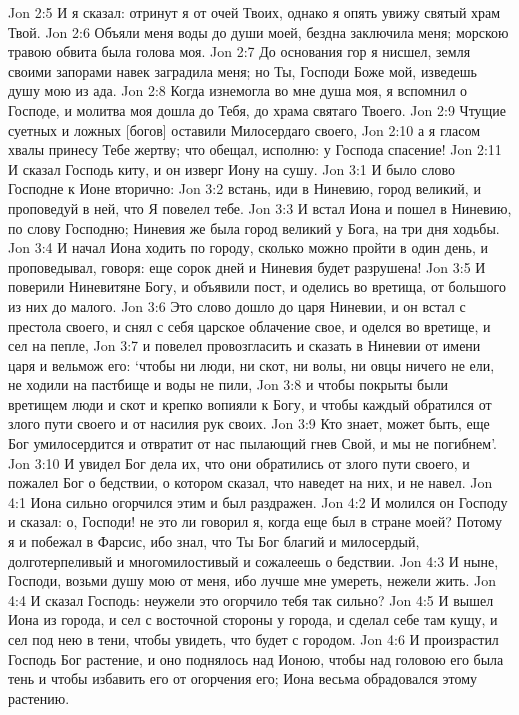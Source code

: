 Jon 2:5  И я сказал: отринут я от очей Твоих, однако я опять увижу святый храм Твой.
Jon 2:6  Объяли меня воды до души моей, бездна заключила меня; морскою травою обвита была голова моя.
Jon 2:7  До основания гор я нисшел, земля своими запорами навек заградила меня; но Ты, Господи Боже мой, изведешь душу мою из ада.
Jon 2:8  Когда изнемогла во мне душа моя, я вспомнил о Господе, и молитва моя дошла до Тебя, до храма святаго Твоего.
Jon 2:9  Чтущие суетных и ложных [богов] оставили Милосердаго своего,
Jon 2:10  а я гласом хвалы принесу Тебе жертву; что обещал, исполню: у Господа спасение!
Jon 2:11  И сказал Господь киту, и он изверг Иону на сушу.
Jon 3:1  И было слово Господне к Ионе вторично:
Jon 3:2  встань, иди в Ниневию, город великий, и проповедуй в ней, что Я повелел тебе.
Jon 3:3  И встал Иона и пошел в Ниневию, по слову Господню; Ниневия же была город великий у Бога, на три дня ходьбы.
Jon 3:4  И начал Иона ходить по городу, сколько можно пройти в один день, и проповедывал, говоря: еще сорок дней и Ниневия будет разрушена!
Jon 3:5  И поверили Ниневитяне Богу, и объявили пост, и оделись во вретища, от большого из них до малого.
Jon 3:6  Это слово дошло до царя Ниневии, и он встал с престола своего, и снял с себя царское облачение свое, и оделся во вретище, и сел на пепле,
Jon 3:7  и повелел провозгласить и сказать в Ниневии от имени царя и вельмож его: `чтобы ни люди, ни скот, ни волы, ни овцы ничего не ели, не ходили на пастбище и воды не пили,
Jon 3:8  и чтобы покрыты были вретищем люди и скот и крепко вопияли к Богу, и чтобы каждый обратился от злого пути своего и от насилия рук своих.
Jon 3:9  Кто знает, может быть, еще Бог умилосердится и отвратит от нас пылающий гнев Свой, и мы не погибнем'.
Jon 3:10  И увидел Бог дела их, что они обратились от злого пути своего, и пожалел Бог о бедствии, о котором сказал, что наведет на них, и не навел.
Jon 4:1  Иона сильно огорчился этим и был раздражен.
Jon 4:2  И молился он Господу и сказал: о, Господи! не это ли говорил я, когда еще был в стране моей? Потому я и побежал в Фарсис, ибо знал, что Ты Бог благий и милосердый, долготерпеливый и многомилостивый и сожалеешь о бедствии.
Jon 4:3  И ныне, Господи, возьми душу мою от меня, ибо лучше мне умереть, нежели жить.
Jon 4:4  И сказал Господь: неужели это огорчило тебя так сильно?
Jon 4:5  И вышел Иона из города, и сел с восточной стороны у города, и сделал себе там кущу, и сел под нею в тени, чтобы увидеть, что будет с городом.
Jon 4:6  И произрастил Господь Бог растение, и оно поднялось над Ионою, чтобы над головою его была тень и чтобы избавить его от огорчения его; Иона весьма обрадовался этому растению.
